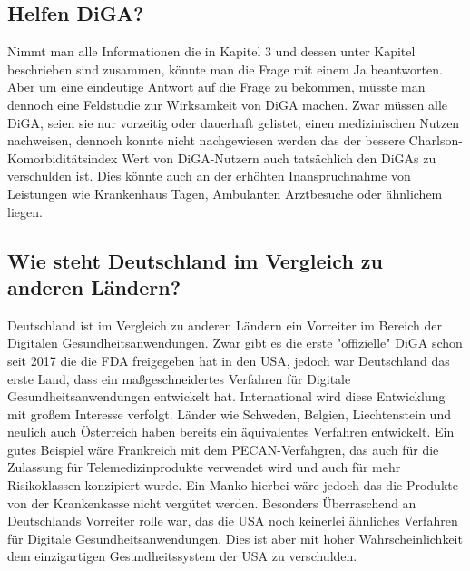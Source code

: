 \documentclass{article}
\begin{document}
		\subsection{Helfen DiGA?}
			Nimmt man alle Informationen die in Kapitel 3 und dessen unter Kapitel beschrieben sind zusammen, könnte man die Frage mit einem Ja beantworten. Aber um eine eindeutige Antwort auf die Frage zu bekommen, müsste man dennoch eine Feldstudie zur Wirksamkeit von DiGA machen. Zwar müssen alle DiGA, seien sie nur vorzeitig oder dauerhaft gelistet, einen medizinischen Nutzen nachweisen, dennoch konnte nicht nachgewiesen werden das der bessere Charlson-Komorbiditätsindex Wert von DiGA-Nutzern auch tatsächlich den DiGAs zu verschulden ist. Dies könnte auch an der erhöhten Inanspruchnahme von Leistungen wie Krankenhaus Tagen, Ambulanten Arztbesuche oder ähnlichem liegen.        
		\subsection{Wie steht Deutschland im Vergleich zu anderen Ländern?}
			Deutschland ist im Vergleich zu anderen Ländern ein Vorreiter im Bereich der Digitalen Gesundheitsanwendungen. Zwar gibt es die erste "offizielle" DiGA schon seit 2017 die die FDA freigegeben hat in den USA, jedoch war Deutschland das erste Land, dass ein maßgeschneidertes Verfahren für Digitale Gesundheitsanwendungen entwickelt hat. International wird diese Entwicklung mit großem Interesse verfolgt. Länder wie Schweden, Belgien, Liechtenstein und neulich auch Österreich haben bereits ein äquivalentes Verfahren entwickelt. Ein gutes Beispiel wäre Frankreich mit dem PECAN-Verfahgren, das auch für die Zulassung für Telemedizinprodukte verwendet wird und auch für mehr Risikoklassen konzipiert wurde. Ein Manko hierbei wäre jedoch das die Produkte von der Krankenkasse nicht vergütet werden. Besonders Überraschend an Deutschlands Vorreiter rolle war, das die USA noch keinerlei ähnliches Verfahren für Digitale Gesundheitsanwendungen. Dies ist aber mit hoher Wahrscheinlichkeit dem einzigartigen Gesundheitssystem der USA zu verschulden.     
\end{document}
